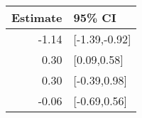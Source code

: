 \begin{tabular}{rl}
  \hline
Estimate & 95\% CI \\ 
  \hline
-1.14 & [-1.39,-0.92] \\ 
  0.30 & [0.09,0.58] \\ 
  0.30 & [-0.39,0.98] \\ 
  -0.06 & [-0.69,0.56] \\ 
   \hline
\end{tabular}

